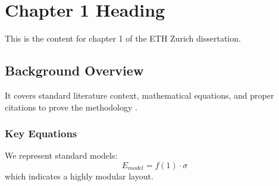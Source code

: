 \chapter{Chapter 1 Heading}
\label{ch:chapter1}
This is the content for chapter 1 of the ETH Zurich dissertation.

\section{Background Overview}
It covers standard literature context, mathematical equations, and proper citations to prove the methodology \cite{texbook}.

\subsection{Key Equations}
We represent standard models:
\begin{equation}
    E_{model} = f(1) \cdot \sigma
\end{equation}
which indicates a highly modular layout.
